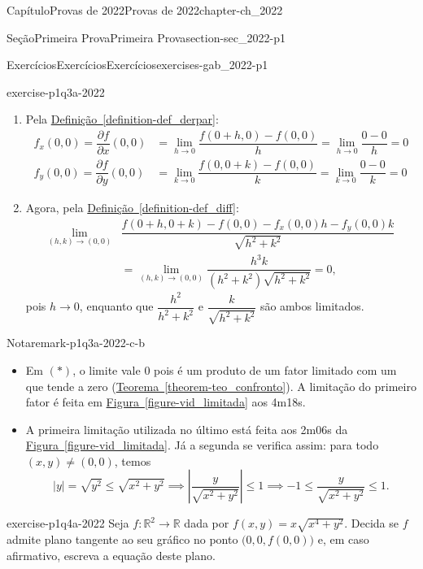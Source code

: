 \documentclass[oneside,10pt,]{book}
\newcommand{\xreffont}{\relax}
\numberwithin{equation}{section}
\newcommand{\R}{\mathbb R}
\begin{document}
\begin{chapterptx}{Capítulo}{Provas de 2022}{}{Provas de 2022}{}{}{chapter-ch_2022}
\begin{sectionptx}{Seção}{Primeira Prova}{}{Primeira Prova}{}{}{section-sec_2022-p1}
\begin{exercises-subsection-numberless}{Exercícios}{Exercícios}{}{Exercícios}{}{}{exercises-gab_2022-p1}
\begin{divisionexercise}{3}{}{}{exercise-p1q3a-2022}
\begin{enumerate}[label=\alph*]
%
\item{}Pela \hyperref[definition-def_derpar]{Definição~{\xreffont\ref{definition-def_derpar}}}:%
\begin{align*}
f_x(0,0)=\dfrac{\partial f}{\partial x}(0,0)
&=\lim\limits_{h\to
0}\dfrac{f(0+h,0)-f(0,0)}{h}=\lim\limits_{h\to
0}\dfrac{0-0}{h}=0\\
f_y(0,0)=\dfrac{\partial f}{\partial y}(0,0)
&=\lim\limits_{k\to 0}\dfrac{f(0,0+k)-f(0,0)}{k}
=\lim\limits_{k\to 0}\dfrac{0-0}{k}=0
\end{align*}
%
\item{}Agora, pela \hyperref[definition-def_diff]{Definição~{\xreffont\ref{definition-def_diff}}}:%
\begin{align*}
\lim\limits_{(h,k)\to(0,0)}&\dfrac{f(0+h,0+k)-f(0,0)
-f_x(0,0)h-f_y(0,0)k}{\sqrt{h^2+k^2}}\\
&=\lim\limits_{(h,k)\to(0,0)}
\dfrac{h^3k}{(h^2+k^2)\sqrt{h^2+k^2}}=0,
\end{align*}
pois \(h\to0\), enquanto que \(\dfrac{h^2}{h^2+k^2}\) e \(\dfrac{k}{\sqrt{h^2+k^2}}\) são ambos limitados.%
\end{enumerate}
\begin{remark}{Nota}{}{remark-p1q3a-2022-c-b}%
%
\begin{itemize}[label=\textbullet]
\item{}Em \((*)\), o limite vale \(0\) pois é um produto de um fator limitado com um que tende a zero (\hyperref[theorem-teo_confronto]{Teorema~{\xreffont\ref{theorem-teo_confronto}}}). A limitação do primeiro fator é feita em \hyperref[figure-vid_limitada]{Figura~{\xreffont\ref{figure-vid_limitada}}} aos 4m18s.%
\item{}A primeira limitação utilizada no último está feita aos 2m06s da \hyperref[figure-vid_limitada]{Figura~{\xreffont\ref{figure-vid_limitada}}}. Já a segunda se verifica assim: para todo \((x,y)\neq (0,0)\), temos%
\begin{equation*}
|y|=\sqrt{y^2}\leq \sqrt{x^2+y^2}\implies
\left|\dfrac{y}{\sqrt{x^2+y^2}}\right|\leq 1\implies -1\leq
\dfrac{y}{\sqrt{x^2+y^2}}\leq 1.
\end{equation*}
%
\end{itemize}
\end{remark}
\end{divisionexercise}%
\begin{divisionexercise}{4}{}{}{exercise-p1q4a-2022}%
Seja \(f\colon\R^2\to\R\) dada por \(f(x,y)=x\sqrt{x^4+y^2}\). Decida se \(f\) admite plano tangente ao seu gráfico no ponto \(\big(0,0,f(0,0)\big)\) e, em caso afirmativo, escreva a equação deste plano.\par\smallskip%

\end{divisionexercise}
\end{exercises-subsection-numberless}
\end{sectionptx}
\end{chapterptx}
\end{document}

